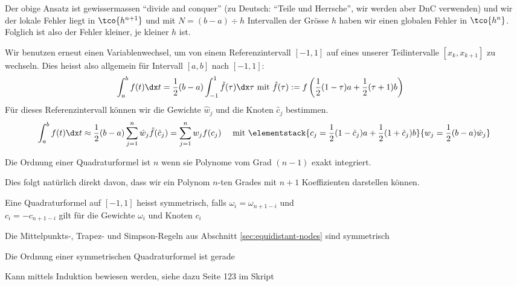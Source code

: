 \rmvspace
Der obige Ansatz ist gewissermassen ``divide and conquer'' (zu Deutsch: ``Teile und Herrsche'', wir werden aber DnC verwenden)
und wir der lokale Fehler liegt in $\tco{h^{n + 1}}$ und mit $N = (b - a) \div h$ Intervallen der Grösse $h$ haben wir einen globalen Fehler in $\tco{h^n}$.
Folglich ist also der Fehler kleiner, je kleiner $h$ ist.

Wir benutzen erneut einen Variablenwechsel, um von einem Referenzintervall $[-1, 1]$ auf eines unserer Teilintervalle $[x_k, x_{k + 1}]$ zu wechseln.
Dies heisst also allgemein für Intervall $[a, b]$ nach $[-1, 1]$:
\begin{align*}
    \int_{a}^{b} f(t) \dx t = \frac{1}{2} (b - a) \int_{-1}^{1} \hat{f}(\tau) \dx \tau & \text{ mit } \hat{f}(\tau) := f\left( \frac{1}{2}(1 - \tau) a + \frac{1}{2}(\tau + 1) b \right)
\end{align*}
Für dieses Referenzintervall können wir die Gewichte $\hat{w}_j$ und die Knoten $\hat{c}_j$ bestimmen.
\rmvspace
\begin{align*}
    \int_{a}^{b} f(t) \dx t \approx \frac{1}{2}(b - a) \sum_{j = 1}^{n} \hat{w}_j \hat{f}(\hat{c}_j) = \sum_{j = 1}^{n} w_j f(c_j)
     &  & \text{ mit } \elementstack{c_j = \frac{1}{2} (1 - \hat{c}_j) a + \frac{1}{2}(1 + \hat{c}_j) b}{w_j = \frac{1}{2}(b - a)\hat{w}_j}
\end{align*}

\rmvspace\rmvspace
\inlinedef Die Ordnung einer Quadraturformel ist $n$ wenn sie Polynome vom Grad $(n - 1)$ exakt integriert.

Dies folgt natürlich direkt davon, dass wir ein Polynom $n$-ten Grades mit $n + 1$ Koeffizienten darstellen können.

 Eine Quadraturformel auf $[-1, 1]$ heisst symmetrisch, falls $\omega_i = \omega_{n + 1 - i}$ und \\
$c_i = -c_{n + 1 -i}$ gilt für die Gewichte $\omega_i$ und Knoten $c_i$

\inlineremark Die Mittelpunkts-, Trapez- und Simpson-Regeln aus Abschnitt \ref{sec:equidistant-nodes} sind symmetrisch

\inlinetheorem Die Ordnung einer symmetrischen Quadraturformel ist gerade

\inlineproof Kann mittels Induktion bewiesen werden, siehe dazu Seite 123 im Skript
